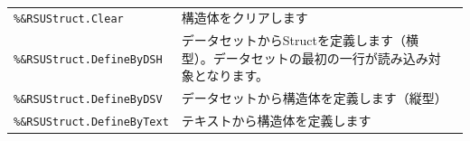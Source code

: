 \paragraph{\DocStrTitleRDMPackageFunctionList}
\begin{center}
{\footnotesize
\begin{xltabular}{\textwidth}{|p{4truecm}|X|p{1.2truecm}|}
\hline
\thead{\DocStrHeaderFunctionName}&\thead{\DocStrDescription}&\thead{\DocStrRefto}\\
\hline
\hline
\texttt{\%\&RSUStruct.Clear}&構造体をクリアします&\\
\hline
\texttt{\%\&RSUStruct.DefineByDSH}&データセットからStructを定義します（横型）。データセットの最初の一行が読み込み対象となります。&\\
\hline
\texttt{\%\&RSUStruct.DefineByDSV}&データセットから構造体を定義します（縦型）&\\
\hline
\texttt{\%\&RSUStruct.DefineByText}&テキストから構造体を定義します&\\
\hline
\end{xltabular}
}
\end{center}
